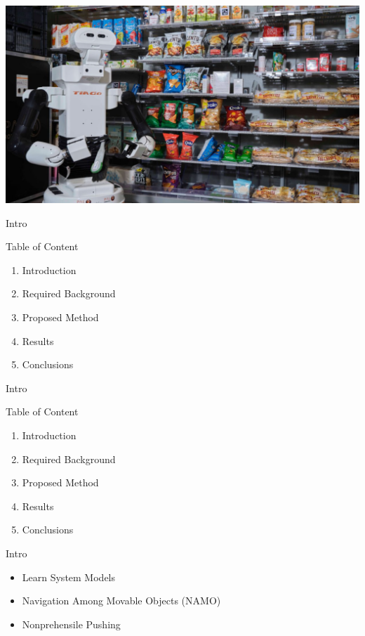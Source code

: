 \begin{frame}[fragile]{} 
\begin{center}
\includegraphics[height=0.9\textheight]{figures/introduction/robot3}
\end{center}
\end{frame}

\begin{frame}[c]{Intro} 
  \begin{block}{Table of Content}
    \begin{enumerate}
      \item Introduction
      \item Required Background
      \item Proposed Method
      \item Results
      \item Conclusions
    \end{enumerate}
  \end{block}
\end{frame}

\begin{frame}[c]{Intro} 
  \begin{block}{Table of Content}
    \begin{enumerate}
      \item Introduction
      \item Required Background
      \item Proposed Method
      \item Results
      \item Conclusions
    \end{enumerate}
  \end{block}
\end{frame}

\begin{frame}[fragile]{Intro} 
\begin{itemize}
  \item Learn System Models\\\pause
  \item Navigation Among Movable Objects (NAMO)\\\pause
  \item Nonprehensile Pushing
\end{itemize}
\end{frame}

